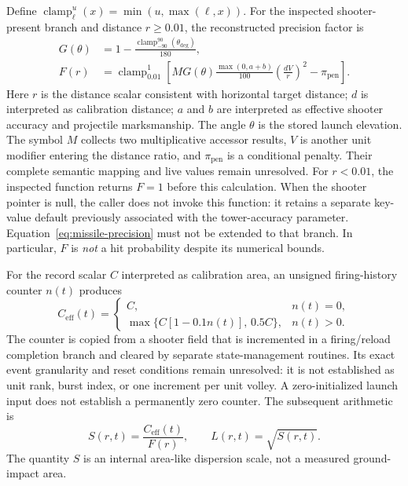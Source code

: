 \documentclass[11pt]{article}
\begin{document}
Define $\operatorname{clamp}_{\ell}^{u}(x)=\min(u,\max(\ell,x))$.
For the inspected shooter-present branch and distance $r\geq0.01$, the
reconstructed precision factor is
\begin{align}
  G(\theta)&=1-\frac{\operatorname{clamp}_{-90}^{90}
                         (\theta_{\mathrm{deg}})}{180},\\
  F(r)&=\operatorname{clamp}_{0.01}^{1}\!\left[
    M G(\theta)\frac{\max(0,a+b)}{100}
    \left(\frac{dV}{r}\right)^2-\pi_{\mathrm{pen}}
  \right].
  \label{eq:missile-precision}
\end{align}
Here $r$ is the distance scalar consistent with horizontal target distance;
$d$ is interpreted as calibration distance; $a$ and $b$ are interpreted as
effective shooter accuracy and projectile marksmanship.  The angle $\theta$
is the stored launch elevation.  The symbol $M$ collects two multiplicative
accessor results, $V$ is another unit modifier entering the distance ratio,
and $\pi_{\mathrm{pen}}$ is a conditional penalty.  Their complete semantic
mapping and live values remain unresolved.  For $r<0.01$, the inspected
function returns $F=1$ before this calculation.  When the shooter pointer
is null, the caller does not invoke this function: it retains a separate
key-value default previously associated with the tower-accuracy parameter.
Equation~\ref{eq:missile-precision} must not be extended to that branch.
In particular, $F$ is
\emph{not} a hit probability despite its numerical bounds.

For the record scalar $C$ interpreted as calibration area, an unsigned
firing-history counter $n(t)$ produces
\begin{equation}
  C_{\mathrm{eff}}(t)=
  \begin{cases}
    C, & n(t)=0,\\
    \max\{C[1-0.1n(t)],\,0.5C\}, & n(t)>0.
  \end{cases}
\end{equation}
The counter is copied from a shooter field that is incremented in a
firing/reload completion branch and cleared by separate state-management
routines.  Its exact event granularity and reset conditions remain unresolved:
it is not established as unit rank, burst index, or one increment per unit
volley.  A zero-initialized launch input does not establish a permanently zero
counter.  The subsequent arithmetic is
\begin{equation}
  S(r,t)=\frac{C_{\mathrm{eff}}(t)}{F(r)},\qquad L(r,t)=\sqrt{S(r,t)}.
  \label{eq:missile-calibration-scale}
\end{equation}
The quantity $S$ is an internal area-like dispersion scale, not a measured
ground-impact area.
\end{document}
